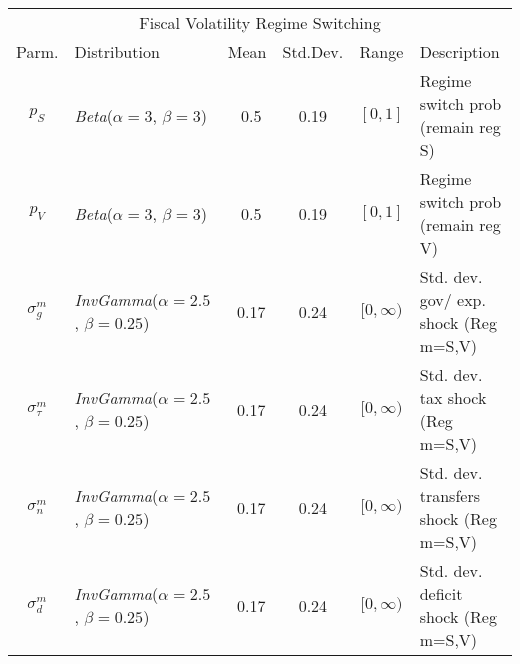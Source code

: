 \documentclass[11pt]{article}
\begin{document}
\begin{table}
\begin{small}
\begin{tabular}{clcccl}
      \multicolumn{6}{c}{Fiscal Volatility Regime Switching} \\
      Parm. & Distribution & Mean & Std.Dev. & Range & Description\\ \hline
      $p_S$ & \textit{Beta}($\alpha=3$, $\beta=3$) & ~0.5 & 0.19 & $[0,1]$ & Regime switch prob (remain reg S) \\ [0.3pc]
      $p_V$ & \textit{Beta}($\alpha=3$, $\beta=3$) & ~0.5 & 0.19 & $[0,1]$ & Regime switch prob (remain reg V) \\ [0.3pc]
      $\sigma_g^m$ & \textit{InvGamma}($\alpha=2.5$, $\beta=0.25$) & ~0.17 & 0.24 & $[0,\infty)$ & Std. dev. gov/ exp. shock (Reg m=S,V) \\ [0.3pc]
      $\sigma_\tau^m$ & \textit{InvGamma}($\alpha=2.5$, $\beta=0.25$) & ~0.17 & 0.24 & $[0,\infty)$ & Std. dev. tax shock (Reg m=S,V) \\ [0.3pc]
      $\sigma_n^m$ & \textit{InvGamma}($\alpha=2.5$, $\beta=0.25$) & ~0.17 & 0.24 & $[0,\infty)$ & Std. dev. transfers shock (Reg m=S,V) \\ [0.3pc]
      $\sigma_d^m$ & \textit{InvGamma}($\alpha=2.5$, $\beta=0.25$) & ~0.17 & 0.24 & $[0,\infty)$ & Std. dev. deficit shock (Reg m=S,V) \\ [0.3pc] \hline

  \end{tabular}
  \end{small}
\end{table}
\end{document}

